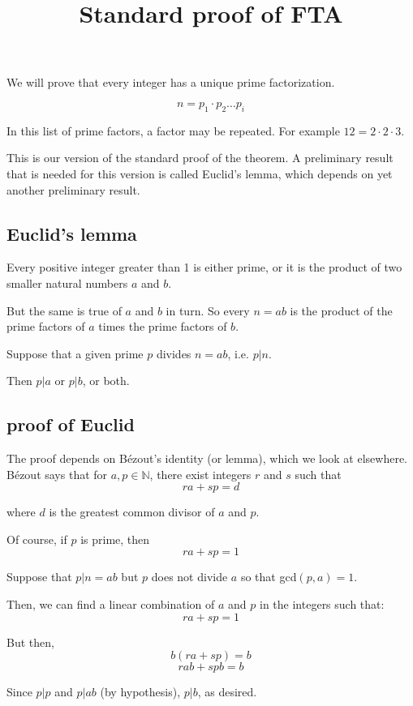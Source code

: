 \documentclass[11pt, oneside]{article}
\title{Standard proof of FTA}
\date{}
\begin{document}
\maketitle
\Large

We will prove that every integer has a unique prime factorization.

\[ n = p_1 \cdot p_2 \dots p_i \]

In this list of prime factors, a factor may be repeated.  For example $12 = 2 \cdot 2 \cdot 3$.

This is our version of the standard proof of the theorem.  A preliminary result that is needed for this version is called Euclid's lemma, which depends on yet another preliminary result.

\subsection*{Euclid's lemma}

Every positive integer greater than 1 is either prime, or it is the product of two smaller natural numbers $a$ and $b$.

But the same is true of $a$ and $b$ in turn.  So every $n = ab$ is the product of the prime factors of $a$ times the prime factors of $b$.

Suppose that a given prime $p$ divides $n=ab$, i.e. $p|n$.

Then $p|a$ or $p|b$, or both.

\subsection*{proof of Euclid}

The proof depends on B\'ezout's identity (or lemma), which we look at elsewhere.  B\'ezout says that for $a,p \in \mathbb{N}$, there exist integers $r$ and $s$ such that
\[ ra + sp = d \]

where $d$ is the greatest common divisor of $a$ and $p$.

Of course, if $p$ is prime, then
\[ ra + sp = 1 \]

Suppose that $p|n = ab$ but $p$ does not divide $a$ so that gcd$(p,a) = 1$.

Then, we can find a linear combination of $a$ and $p$ in the integers such that:
\[ ra + sp = 1 \]

But then, 
\[ b(ra + sp) = b \]
\[ rab + spb = b \]

Since $p|p$ and $p|ab$ (by hypothesis), $p|b$, as desired.
\end{document}
